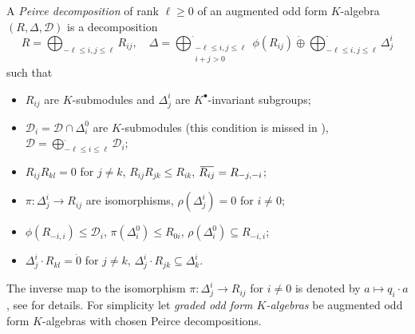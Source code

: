 \documentclass{article}
\theoremstyle{definition}
\newcommand{\dotoplus}{\mathbin{\dot{\oplus}}}
\newcommand{\inv}[1]{
    \!\;\overline{
        \!\!\:#1\vphantom !\!\!\:
    }\;\!
}
\begin{document}
A \textit{Peirce decomposition} of rank \(
    \ell \geq 0
\) of an augmented odd form \(K\)-algebra \(
    (R, \Delta, \mathcal D)
\) is a decomposition \[
    R
    =
    \bigoplus_{-\ell \leq i, j \leq \ell} R_{ij},
    \quad \Delta
    =
    \bigoplus^\cdot_{\substack{
        -\ell \leq i, j \leq \ell\\
        i + j > 0
    }} \phi(R_{ij})
    \dotoplus \bigoplus^\cdot_{
        -\ell \leq i, j \leq \ell
    } \Delta^i_j
\]
such that
\begin{itemize}
    \item \(R_{ij}\) are \(K\)-submodules and \(\Delta^i_j\) are \(K^\bullet\)-invariant subgroups;
    \item \(
        \mathcal D_i = \mathcal D \cap \Delta^0_i
    \) are \(K\)-submodules (this condition is missed in \cite{thesis}), \(
        \mathcal D
        =
        \bigoplus_{
            -\ell \leq i \leq \ell
        }^\cdot \mathcal D_i
    \);
    \item \(
        R_{ij} R_{kl} = 0
    \) for \(j \neq k\), \(
        R_{ij} R_{jk} \leq R_{ik}
    \), \(
        \inv{R_{ij}} = R_{-j, -i}
    \);
    \item \(
        \pi \colon \Delta^i_j \to R_{ij}
    \) are isomorphisms, \(
        \rho(\Delta^i_j) = 0
    \) for \(i \neq 0\);
    \item \(
        \phi(R_{-i, i}) \leq \mathcal D_i
    \), \(
        \pi(\Delta^0_i) \leq R_{0i}
    \), \(
        \rho(\Delta^0_i) \subseteq R_{-i, i}
    \);
    \item \(
        \Delta^i_j \cdot R_{kl} = \dot 0
    \) for \(j \neq k\), \(
        \Delta^i_j \cdot R_{jk} \subseteq \Delta^i_k
    \).
\end{itemize}
The inverse map to the isomorphism \(
    \pi \colon \Delta^i_j \to R_{ij}
\) for \(i \neq 0\) is denoted by \(
    a \mapsto q_i \cdot a
\), see \cite[lemma 7]{thesis} for details. For simplicity let \textit{graded odd form \(K\)-algebras} be augmented odd form \(K\)-algebras with chosen Peirce decompositions.
\end{document}
